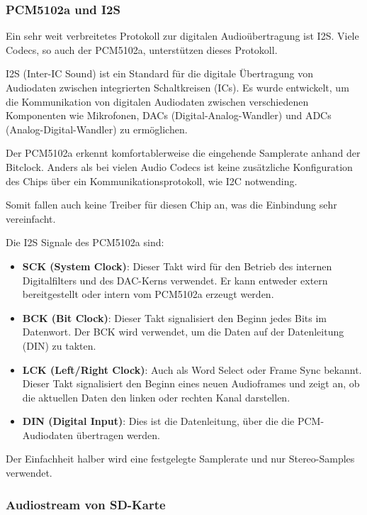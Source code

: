 \subsubsection{PCM5102a und I2S}\label{sec:pcm5102a-und-i2s}

Ein sehr weit verbreitetes Protokoll zur digitalen Audioübertragung ist I2S. Viele Codecs, so auch der PCM5102a, unterstützen dieses Protokoll.

I2S (Inter-IC Sound) ist ein Standard für die digitale Übertragung von Audiodaten zwischen integrierten Schaltkreisen (ICs). Es wurde entwickelt, um die Kommunikation von digitalen Audiodaten zwischen verschiedenen Komponenten wie Mikrofonen, DACs (Digital-Analog-Wandler) und ADCs (Analog-Digital-Wandler) zu ermöglichen. \cite{i2s-reference}

Der PCM5102a erkennt komfortablerweise die eingehende Samplerate anhand der Bitclock.
Anders als bei vielen Audio Codecs ist keine zusätzliche Konfiguration des Chips über ein Kommunikationsprotokoll, wie I2C notwending.

Somit fallen auch keine Treiber für diesen Chip an, was die Einbindung sehr vereinfacht.

Die I2S Signale des PCM5102a sind:

\begin{itemize}
	\item \textbf{SCK (System Clock)}: Dieser Takt wird für den Betrieb des internen Digitalfilters und des DAC-Kerns verwendet. Er kann entweder extern bereitgestellt oder intern vom PCM5102a erzeugt werden.
	\item \textbf{BCK (Bit Clock)}: Dieser Takt signalisiert den Beginn jedes Bits im Datenwort. Der BCK wird verwendet, um die Daten auf der Datenleitung (DIN) zu takten.
	\item \textbf{LCK (Left/Right Clock)}: Auch als Word Select oder Frame Sync bekannt. Dieser Takt signalisiert den Beginn eines neuen Audioframes und zeigt an, ob die aktuellen Daten den linken oder rechten Kanal darstellen.
	\item \textbf{DIN (Digital Input)}: Dies ist die Datenleitung, über die die PCM-Audiodaten übertragen werden.
\end{itemize}

Der Einfachheit halber wird eine festgelegte Samplerate und nur Stereo-Samples verwendet.

\subsubsection{Audiostream von SD-Karte}
\label{sec:sd-card-audio}

